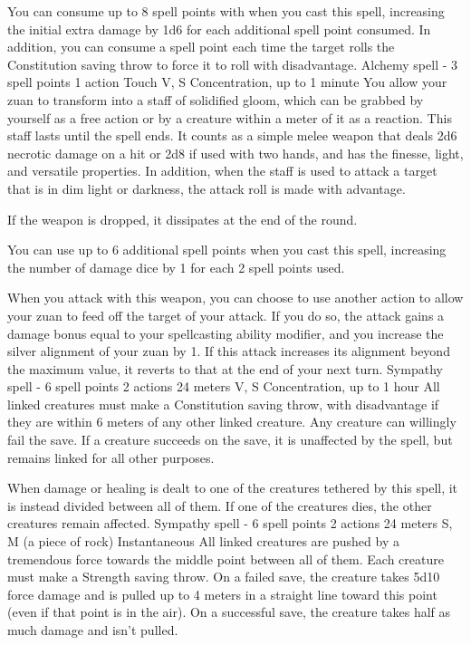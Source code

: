     You can consume up to 8 spell points with when you cast this spell, increasing the initial extra damage by 1d6 for each additional spell point consumed.
    In addition, you can consume a spell point each time the target rolls the Constitution saving throw to force it to roll with disadvantage.
    {Alchemy spell - 3 spell points}
    {1 action}
    {Touch}
    {V, S}
    {Concentration, up to 1 minute}
    You allow your zuan to transform into a staff of solidified gloom, which can be grabbed by yourself as a free action or by a creature within a meter of it as a reaction.
    This staff lasts until the spell ends.
    It counts as a simple melee weapon that deals 2d6 necrotic damage on a hit or 2d8 if used with two hands, and has the finesse, light, and versatile properties.
    In addition, when the staff is used to attack a target that is in dim light or darkness, the attack roll is made with advantage.

    If the weapon is dropped, it dissipates at the end of the round.

    You can use up to 6 additional spell points when you cast this spell, increasing the number of damage dice by 1 for each 2 spell points used.

    When you attack with this weapon, you can choose to use another action to allow your zuan to feed off the target of your attack.
    If you do so, the attack gains a damage bonus equal to your spellcasting ability modifier, and you increase the silver alignment of your zuan by 1.
    If this attack increases its alignment beyond the maximum value, it reverts to that at the end of your next turn.
    {Sympathy spell - 6 spell points}
    {2 actions}
    {24 meters}
    {V, S}
    {Concentration, up to 1 hour}
    All linked creatures must make a Constitution saving throw, with disadvantage if they are within 6 meters of any other linked creature.
    Any creature can willingly fail the save.
    If a creature succeeds on the save, it is unaffected by the spell, but remains linked for all other purposes.

    When damage or healing is dealt to one of the creatures tethered by this spell, it is instead divided between all of them.
    If one of the creatures dies, the other creatures remain affected.
    {Sympathy spell - 6 spell points}
    {2 actions}
    {24 meters}
    {S, M (a piece of rock)}
    {Instantaneous}
    All linked creatures are pushed by a tremendous force towards the middle point between all of them.
    Each creature must make a Strength saving throw.
    On a failed save, the creature takes 5d10 force damage and is pulled up to 4 meters in a straight line toward this point (even if that point is in the air).
    On a successful save, the creature takes half as much damage and isn't pulled.

